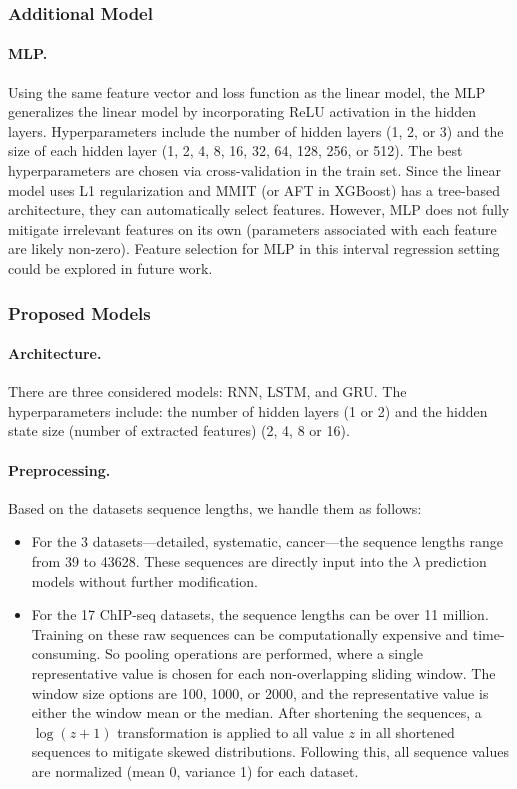 \documentclass[12pt]{article}
\begin{document}
\subsubsection{Additional Model}
\paragraph{MLP.}
Using the same feature vector and loss function as the linear model, the MLP generalizes the linear model by incorporating ReLU activation in the hidden layers.
Hyperparameters include the number of hidden layers (1, 2, or 3) and the size of each hidden layer (1, 2, 4, 8, 16, 32, 64, 128, 256, or 512).
The best hyperparameters are chosen via cross-validation in the train set.
Since the linear model uses L1 regularization and MMIT (or AFT in XGBoost) has a tree-based architecture, they can automatically select features. 
However, MLP does not fully mitigate irrelevant features on its own (parameters associated with each feature are likely non-zero). 
Feature selection for MLP in this interval regression setting could be explored in future work.

\subsubsection{Proposed Models}
\paragraph{Architecture.} There are three considered models: RNN, LSTM, and GRU. The hyperparameters include: the number of hidden layers (1 or 2) and the hidden state size (number of extracted features) (2, 4, 8 or 16).


\paragraph{Preprocessing.} Based on the datasets sequence lengths, we handle them as follows:
\begin{itemize}
    \item For the 3 datasets—detailed, systematic, cancer—the sequence lengths range from 39 to 43628. 
    These sequences are directly input into the $\lambda$ prediction models without further modification.
    \item For the 17 ChIP-seq datasets, the sequence lengths can be over 11 million.
    Training on these raw sequences can be computationally expensive and time-consuming.
    So pooling operations are performed, where a single representative value is chosen for each non-overlapping sliding window. The window size options are 100, 1000, or 2000, and the representative value is either the window mean or the median. After shortening the sequences, a $\log(z+1)$ transformation is applied to all value $z$ in all shortened sequences to mitigate skewed distributions. Following this, all sequence values are normalized (mean 0, variance 1) for each dataset.
\end{itemize}
\end{document}
